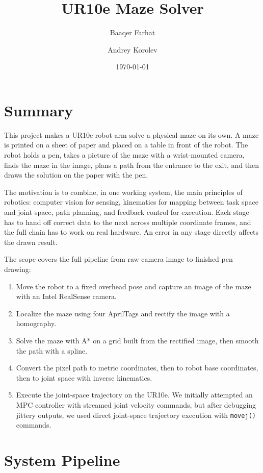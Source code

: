 \documentclass[11pt]{article}
\title{\textbf{UR10e Maze Solver}}
\author{Baaqer Farhat \and Andrey Korolev}
\date{\today}
\begin{document}
\maketitle

\section{Summary}

This project makes a UR10e robot arm solve a physical maze on its own. A maze is printed on a sheet of paper and placed on a table in front of the robot. The robot holds a pen, takes a picture of the maze with a wrist-mounted camera, finds the maze in the image, plans a path from the entrance to the exit, and then draws the solution on the paper with the pen.

The motivation is to combine, in one working system, the main principles of robotics: computer vision for sensing, kinematics for mapping between task space and joint space, path planning, and feedback control for execution. Each stage has to hand off correct data to the next across multiple coordinate frames, and the full chain has to work on real hardware. An error in any stage directly affects the drawn result.

The scope covers the full pipeline from raw camera image to finished pen drawing:

\begin{enumerate}
\item Move the robot to a fixed overhead pose and capture an image of the maze with an Intel RealSense camera.
\item Localize the maze using four AprilTags and rectify the image with a homography.
\item Solve the maze with A* on a grid built from the rectified image, then smooth the path with a spline.
\item Convert the pixel path to metric coordinates, then to robot base coordinates, then to joint space with inverse kinematics.
\item Execute the joint-space trajectory on the UR10e. We initially attempted an MPC controller with streamed joint velocity commands, but after debugging jittery outputs, we used direct joint-space trajectory execution with \texttt{movej()} commands.
\end{enumerate}

\section{System Pipeline}
\end{document}
